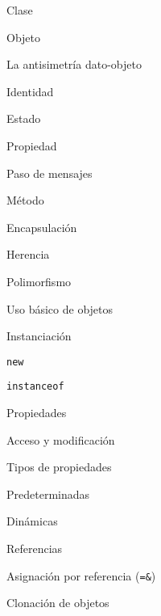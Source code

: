 \begin{longenum}
\begin{longenum}
        \begin{longenum}
            \item Clase
            \item Objeto
            \begin{longenum}
                \item La antisimetría dato-objeto
            \end{longenum}
            \item Identidad
            \item Estado
            \item Propiedad
            \item Paso de mensajes
            \item Método
            \item Encapsulación
            \item Herencia
            \item Polimorfismo
        \end{longenum}
        \item Uso básico de objetos
        \begin{longenum}
            \item Instanciación
            \begin{longenum}
                \item \texttt{new}
                \item \texttt{instanceof}
            \end{longenum}
            \item Propiedades
            \begin{longenum}
                \item Acceso y modificación
                \item Tipos de propiedades
                \begin{longenum}
                    \item Predeterminadas
                    \item Dinámicas
                \end{longenum}
            \end{longenum}
            \item Referencias
            \begin{longenum}
                \item Asignación por referencia (\texttt{=\&})
            \end{longenum}
            \item Clonación de objetos

\end{longenum}
\end{longenum}
\end{longenum}
